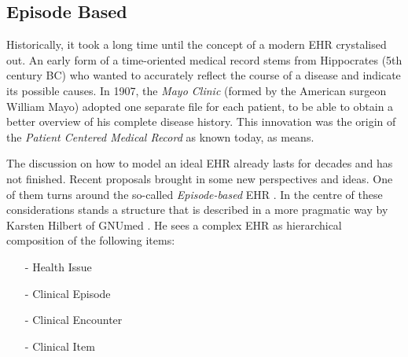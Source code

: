 %
%
%
%
%
%
%

\subsection{Episode Based}
\label{episode_based_heading}

Historically, it took a long time until the concept of a modern EHR crystalised
out. An early form of a time-oriented medical record stems from Hippocrates
(5th century BC) who wanted to accurately reflect the course of a disease and
indicate its possible causes. In 1907, the \emph{Mayo Clinic} (formed by the
American surgeon William Mayo) adopted one separate file for each patient, to
be able to obtain a better overview of his complete disease history. This
innovation was the origin of the \emph{Patient Centered Medical Record} as
known today, as \cite{mihandbook} means.

The discussion on how to model an ideal EHR already lasts for decades and has
not finished. Recent proposals brought in some new perspectives and ideas. One
of them turns around the so-called \emph{Episode-based} EHR \cite{westerhof}.
In the centre of these considerations stands a structure that is described in a
more pragmatic way by Karsten Hilbert of GNUmed \cite{gnumed}. He sees a
complex EHR as hierarchical composition of the following items:

\begin{itemize}
    \item[-] Health Issue
    \item[-] Clinical Episode
    \item[-] Clinical Encounter
    \item[-] Clinical Item
\end{itemize}

